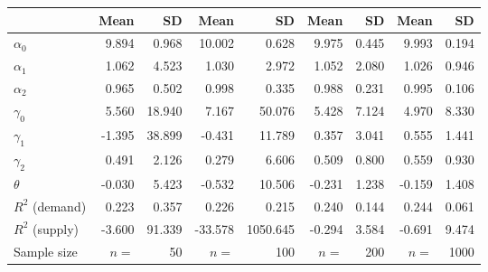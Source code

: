 
\begin{tabular}[t]{lrrrrrrrr}
\toprule
  & Mean & SD & Mean  & SD  & Mean   & SD   & Mean    & SD   \\
\midrule
$\alpha_{0}$ & 9.894 & 0.968 & 10.002 & 0.628 & 9.975 & 0.445 & 9.993 & 0.194\\
$\alpha_{1}$ & 1.062 & 4.523 & 1.030 & 2.972 & 1.052 & 2.080 & 1.026 & 0.946\\
$\alpha_{2}$ & 0.965 & 0.502 & 0.998 & 0.335 & 0.988 & 0.231 & 0.995 & 0.106\\
$\gamma_{0}$ & 5.560 & 18.940 & 7.167 & 50.076 & 5.428 & 7.124 & 4.970 & 8.330\\
$\gamma_{1}$ & -1.395 & 38.899 & -0.431 & 11.789 & 0.357 & 3.041 & 0.555 & 1.441\\
$\gamma_{2}$ & 0.491 & 2.126 & 0.279 & 6.606 & 0.509 & 0.800 & 0.559 & 0.930\\
$\theta$ & -0.030 & 5.423 & -0.532 & 10.506 & -0.231 & 1.238 & -0.159 & 1.408\\
$R^{2}$ (demand) & 0.223 & 0.357 & 0.226 & 0.215 & 0.240 & 0.144 & 0.244 & 0.061\\
$R^{2}$ (supply) & -3.600 & 91.339 & -33.578 & 1050.645 & -0.294 & 3.584 & -0.691 & 9.474\\
Sample size & $n =$ & 50 & $n =$ & 100 & $n =$ & 200 & $n =$ & 1000\\
\bottomrule
\end{tabular}
